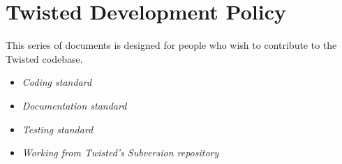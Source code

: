 \section{Twisted Development Policy\label{doc/howto/policy/index.xhtml}}


 This series of documents is designed for people who wish to contribute to the Twisted codebase. \begin{itemize}
\item \textit{Coding standard}
\item \textit{Documentation standard}
\item \textit{Testing standard}
\item \textit{Working from Twisted's Subversion    repository}
\end{itemize}

